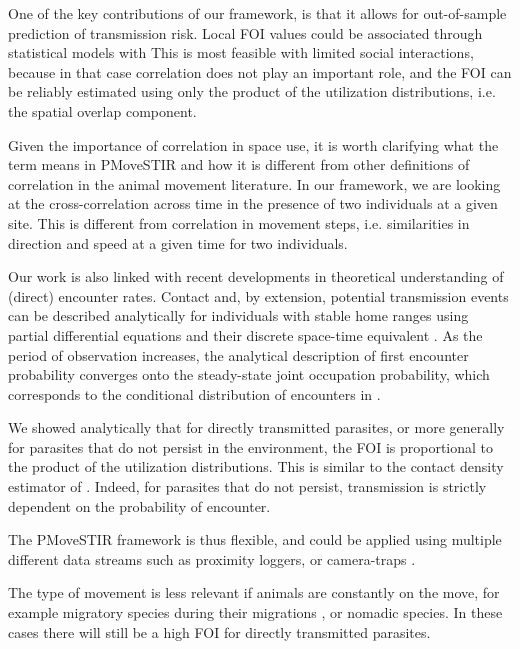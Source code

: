 \documentclass[letterpaper]{article}
\begin{document}
One of the key contributions of our framework, is that it allows for out-of-sample prediction of transmission risk. Local FOI values could be associated through statistical models with 
This is most feasible with limited social interactions, because in that case correlation does not play an important role, and the FOI can be reliably estimated using only the product of the utilization distributions, i.e. the spatial overlap component. 


Given the importance of correlation in space use, it is worth clarifying what the term means in PMoveSTIR and how it is different from other definitions of correlation in the animal movement literature. In our framework, we are looking at the cross-correlation across time in the presence of two individuals at a given site. This is different from correlation in movement steps, i.e. similarities in direction and speed at a given time for two individuals. 

Our work is also linked with recent developments in theoretical understanding of (direct) encounter rates. Contact and, by extension, potential transmission events can be described analytically for individuals with stable home ranges using partial differential equations and their discrete space-time equivalent \citep{Das2023}. As the period of observation increases, the analytical description of first encounter probability converges onto the steady-state joint occupation probability, which corresponds to the conditional distribution of encounters in \citet{Noonan2021}. %

We showed analytically that for directly transmitted parasites, or more generally for parasites that do not persist in the environment, the FOI is proportional to the product of the utilization distributions. This is similar to the contact density estimator of \citet{Noonan2021}. Indeed, for parasites that do not persist, transmission is strictly dependent on the probability of encounter.

 
The PMoveSTIR framework is thus flexible, and could be applied using multiple different data streams such as proximity loggers, or camera-traps \citep{Wilber2022}.



The type of movement is less relevant if animals are constantly on the move, for example migratory species during their migrations \citep{Peacock2018}, or nomadic species. In these cases there will still be a high FOI for directly transmitted parasites.
\end{document}
